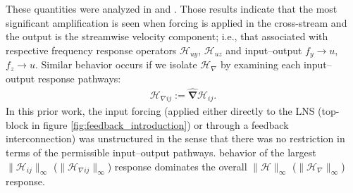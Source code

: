 These quantities were analyzed in \citep{jovanovic2004modeling} and \citep{schmid2007nonmodal}. Those results indicate that the most significant amplification is seen when forcing is applied in the cross-stream and the output is the streamwise velocity component; i.e., that associated with respective frequency response operators $\mathcal{H}_{uy}$, $\mathcal{H}_{uz}$ and input--output  $f_y\rightarrow u$, $f_z\rightarrow u$. Similar behavior occurs if we isolate $\mathcal{H}_{\nabla}$ by examining each input--output response pathways:
\begin{align}
    \mathcal{H}_{\nabla ij}:=\boldsymbol{\widehat{\nabla}}\mathcal{H}_{ij}. 
    \label{eq:H_nabla_ij_def}
\end{align}
In this prior work, the input forcing (applied either directly to the LNS (top-block in figure \ref{fig:feedback_introduction}) or through a feedback interconnection) was unstructured in the sense that there was no restriction in terms of the permissible input--output pathways.  behavior of the largest $\|\mathcal{H}_{ij}\|_\infty$ ($\|\mathcal{H}_{\nabla {ij}}\|_\infty$) response  dominates the overall $\|\mathcal{H}\|_\infty$ ($\|\mathcal{H}_\nabla\|_\infty$) response. 

